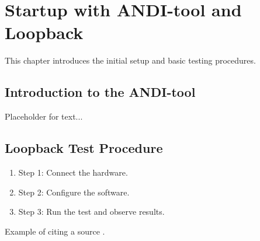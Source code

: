 \section{Startup with ANDI-tool and Loopback}
\label{sec:andi-tool}

This chapter introduces the initial setup and basic testing procedures.

\subsection{Introduction to the ANDI-tool}
Placeholder for text...

\subsection{Loopback Test Procedure}
\begin{enumerate}
    \item Step 1: Connect the hardware.
    \item Step 2: Configure the software.
    \item Step 3: Run the test and observe results.
\end{enumerate}

Example of citing a source \cite{Author2023}.
